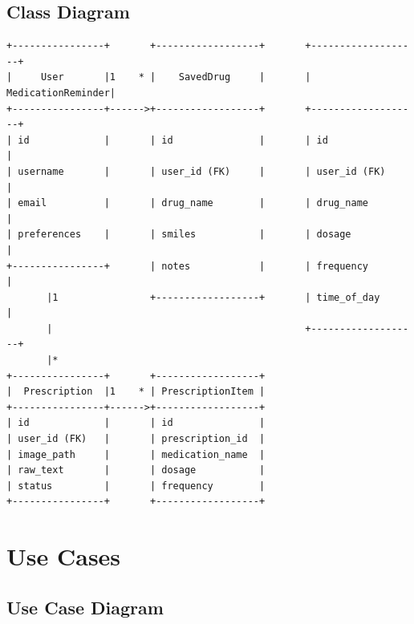 \documentclass[12pt,a4paper]{report}
\begin{document}
\section{Class Diagram}

\begin{verbatim}
+----------------+       +------------------+       +-------------------+
|     User       |1    * |    SavedDrug     |       | MedicationReminder|
+----------------+------>+------------------+       +-------------------+
| id             |       | id               |       | id                |
| username       |       | user_id (FK)     |       | user_id (FK)      |
| email          |       | drug_name        |       | drug_name         |
| preferences    |       | smiles           |       | dosage            |
+----------------+       | notes            |       | frequency         |
       |1                +------------------+       | time_of_day       |
       |                                            +-------------------+
       |*
+----------------+       +------------------+
|  Prescription  |1    * | PrescriptionItem |
+----------------+------>+------------------+
| id             |       | id               |
| user_id (FK)   |       | prescription_id  |
| image_path     |       | medication_name  |
| raw_text       |       | dosage           |
| status         |       | frequency        |
+----------------+       +------------------+
\end{verbatim}

\newpage

\chapter{Use Cases}

\section{Use Case Diagram}
\end{document}
